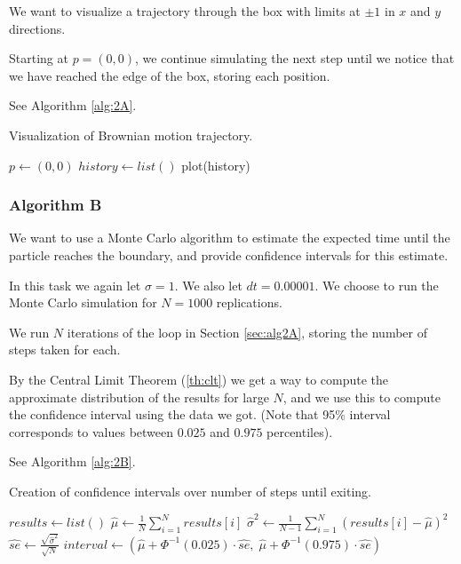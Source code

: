 We want to visualize a trajectory through the box with limits at $\pm 1$ in $x$ and $y$ directions. 

Starting at $p = (0,0)$, we continue simulating the next step until we notice that we have reached the edge of the box, storing each position. 

See Algorithm \ref{alg:2A}.

\begin{algorithm}[H]
    \label{alg:2A}
    \caption{Visualization of Brownian motion trajectory.}
    $p \gets (0,0)$ \;
    $history \gets list()$ 
    plot(history) 
\end{algorithm}


\subsubsection{Algorithm B}
\label{sec:alg2B}

We want to use a Monte Carlo algorithm to estimate the expected time until the particle reaches the boundary, and provide confidence intervals for this estimate.

In this task we again let $\sigma = 1$.  We also let $dt = 0.00001$. We choose to run the Monte Carlo simulation for $N = 1000$ replications.

We run $N$ iterations of the loop in Section \ref{sec:alg2A}, storing the number of steps taken for each.

By the Central Limit Theorem (\ref{th:clt}) we get a way to compute the approximate distribution of the results for large $N$, and we use this to compute the confidence interval using the data we got. (Note that 95\% interval corresponds to values between $0.025$ and $0.975$ percentiles).

See Algorithm \ref{alg:2B}.

\begin{algorithm}[H]
    \label{alg:2B}
    \caption{Creation of confidence intervals over number of steps until exiting.}
    $results \gets list()$ 
    $\hat{\mu} \gets \frac{1}{N}\sum^{N}_{i=1} results[i]$ \;
    $\hat{\sigma}^2 \gets \frac{1}{N-1}\sum^{N}_{i=1} (results[i] - \hat{\mu})^2$ \;
    $\hat{se} \gets \frac{\sqrt{\hat{\sigma}^2}}{\sqrt{N}}$ \;
    $interval \gets (\hat{\mu} + \Phi^{-1}(0.025) \cdot \hat{se}, \; \hat{\mu} + \Phi^{-1}(0.975)\cdot\hat{se})$
\end{algorithm}


